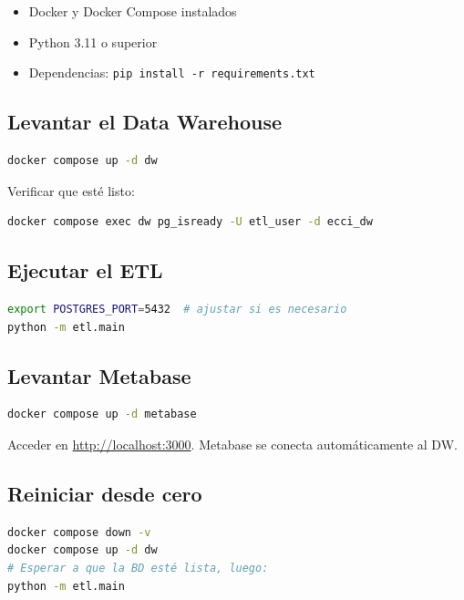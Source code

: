 \documentclass[12pt, letterpaper]{article}
\begin{document}
\begin{itemize}
  \item Docker y Docker Compose instalados
  \item Python 3.11 o superior
  \item Dependencias: \texttt{pip install -r requirements.txt}
\end{itemize}

\subsection{Levantar el Data Warehouse}

\begin{lstlisting}[language=bash]
docker compose up -d dw
\end{lstlisting}

Verificar que esté listo:
\begin{lstlisting}[language=bash]
docker compose exec dw pg_isready -U etl_user -d ecci_dw
\end{lstlisting}

\subsection{Ejecutar el ETL}

\begin{lstlisting}[language=bash]
export POSTGRES_PORT=5432  # ajustar si es necesario
python -m etl.main
\end{lstlisting}

\subsection{Levantar Metabase}

\begin{lstlisting}[language=bash]
docker compose up -d metabase
\end{lstlisting}

Acceder en \url{http://localhost:3000}. Metabase se conecta automáticamente al DW.

\subsection{Reiniciar desde cero}

\begin{lstlisting}[language=bash]
docker compose down -v
docker compose up -d dw
# Esperar a que la BD esté lista, luego:
python -m etl.main
\end{lstlisting}
\end{document}
